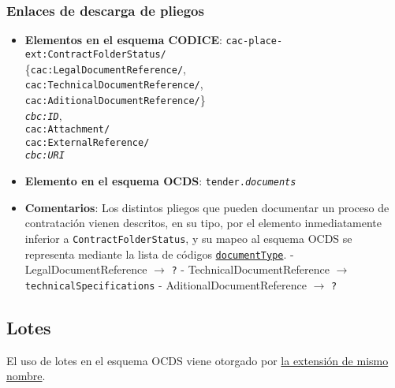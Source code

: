         \subsubsection{Enlaces de descarga de pliegos}
            \begin{itemize}
                \item \textbf{Elementos en el esquema CODICE}:
                    \tabto{7.7cm} \texttt{cac-place-ext:ContractFolderStatus/} \\
                    \tabto{7.7cm} \{\texttt{cac:LegalDocumentReference/}, \\
                    \tabto{7.7cm} \texttt{cac:TechnicalDocumentReference/}, \\
                    \tabto{7.7cm} \texttt{cac:AditionalDocumentReference/}\} \\
                    \tabto{7.7cm} \texttt{\textit{cbc:ID}},\\
                    \tabto{7.7cm} \texttt{cac:Attachment/} \\
                    \tabto{7.7cm} \texttt{cac:ExternalReference/} \\
                    \tabto{7.7cm} \texttt{\textit{cbc:URI}}
                \item \textbf{Elemento en el esquema OCDS}:
                    \tabto{7.7cm} \texttt{tender.\textit{documents}}
                \item \textbf{Comentarios}: Los distintos pliegos que pueden documentar un proceso de contratación vienen descritos, en su tipo, por el elemento inmediatamente inferior a \texttt{ContractFolderStatus}, y su mapeo al esquema OCDS se representa mediante la lista de códigos \href{https://standard.open-contracting.org/latest/es/schema/codelists/#document-type}{\texttt{documentType}}.
                        \subitem - LegalDocumentReference $\rightarrow$ \texttt{?}
                        \subitem - TechnicalDocumentReference $\rightarrow$ \texttt{technicalSpecifications}
                        \subitem - AditionalDocumentReference $\rightarrow$ \texttt{?}
            \end{itemize}

    \vspace{0.3cm}
    
    \subsection{Lotes}
        
        El uso de lotes en el esquema OCDS viene otorgado por  \href{https://extensions.open-contracting.org/en/extensions/lots/v1.1.5/}{la extensión de mismo nombre}.
    
